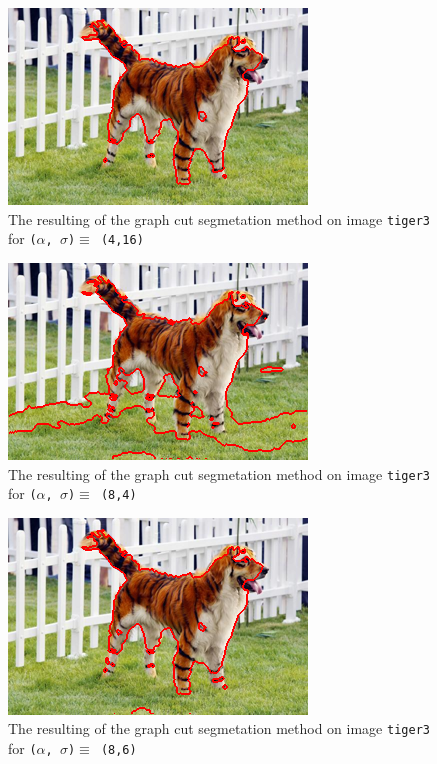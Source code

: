 {  \begin{minipage}{0.45\linewidth}
    \begin{figure}[H]
      \includegraphics[scale=0.5]{./images/04/Q11/var_a_b/tiger3/graphcut2_a4_s16.png}
      \caption{The resulting of the graph cut segmetation method on image \texttt{tiger3} for
        \texttt{($\alpha$, $\sigma$)$ \equiv$ (4,16)}}
      \label{fig:04_tiger32_a4_s16}
    \end{figure}
    \vfill
    \begin{figure}[H]
      \includegraphics[scale=0.5]{./images/04/Q11/var_a_b/tiger3/graphcut2_a8_s4.png}
      \caption{The resulting of the graph cut segmetation method on image \texttt{tiger3} for
        \texttt{($\alpha$, $\sigma$)$ \equiv$ (8,4)}}
      \label{fig:04_tiger32_a8_s4}
    \end{figure}
    \vfill
    \begin{figure}[H]
      \includegraphics[scale=0.5]{./images/04/Q11/var_a_b/tiger3/graphcut2_a8_s6.png}
      \caption{The resulting of the graph cut segmetation method on image \texttt{tiger3} for
        \texttt{($\alpha$, $\sigma$)$ \equiv$ (8,6)}}
      \label{fig:04_tiger32_a8_s6}
    \end{figure}
  \end{minipage}
}


